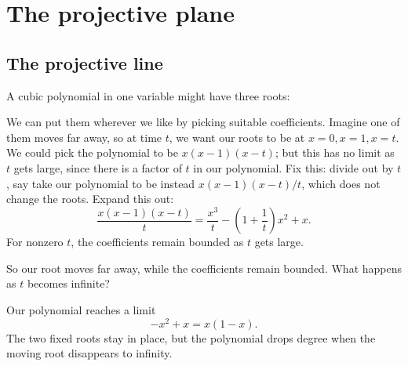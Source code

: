 \chapter{The projective plane}\label{chapter:projective.plane}%
\section{The projective line}
A cubic polynomial in one variable might have three roots:
\begin{center}

\end{center}
We can put them wherever we like by picking suitable coefficients.
Imagine one of them moves far away, so at time \(t\), we want our roots to be at \(x=0,x=1,x=t\).
We could pick the polynomial to be \(x(x-1)(x-t)\); but this has no limit as \(t\) gets large, 
since there is a factor of \(t\) in our polynomial.
Fix this: divide out by \(t\), say take our polynomial to be instead \(x(x-1)(x-t)/t\), which does not change the roots.
Expand this out:
\[
\frac{x(x-1)(x-t)}{t}=\frac{x^3}{t}-\left(1+\frac{1}{t}\right)x^2+x.
\]
For nonzero \(t\), the coefficients remain bounded as \(t\) gets large.
\begin{center}

\end{center}
So our root moves far away, while the coefficients remain bounded.
What happens as \(t\) becomes infinite?
\begin{center}

\end{center}
Our polynomial reaches a limit
\[
-x^2+x=x(1-x).
\]
The two fixed roots stay in place, but the polynomial drops degree when the moving root disappears to infinity.

